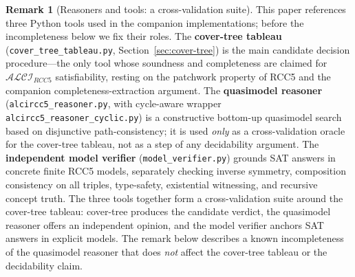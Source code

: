 \documentclass[
]{ceurart}
\theoremstyle{definition}
\newtheorem{remark}[theorem]{Remark}
\newcommand{\ALCIRCC}[1]{\ensuremath{\mathcal{ALCI}_{\mathit{RCC#1}}}}
\begin{document}
\begin{remark}[Reasoners and tools: a cross-validation suite]
\label{rem:tools}
This paper references three Python tools used in the companion
implementations; before the incompleteness below we fix their
roles. The \textbf{cover-tree tableau}
(\texttt{cover\_tree\_tableau.py}, Section~\ref{sec:cover-tree})
is the main candidate decision procedure---the only tool whose
soundness and completeness are claimed for $\ALCIRCC{5}$
satisfiability, resting on the patchwork property of RCC5 and
the companion completeness-extraction argument. The
\textbf{quasimodel reasoner}~\cite{QuasimodelReasoner}
(\texttt{alcircc5\_reasoner.py}, with cycle-aware wrapper
\texttt{alcircc5\_reasoner\_cyclic.py}) is a constructive
bottom-up quasimodel search based on disjunctive
path-consistency; it is used \emph{only} as a cross-validation
oracle for the cover-tree tableau, not as a step of any
decidability argument. The \textbf{independent model verifier}
(\texttt{model\_verifier.py}) grounds SAT answers in concrete
finite RCC5 models, separately checking inverse symmetry,
composition consistency on all triples, type-safety,
existential witnessing, and recursive concept truth. The three
tools together form a cross-validation suite around the
cover-tree tableau: cover-tree produces the candidate verdict,
the quasimodel reasoner offers an independent opinion, and the
model verifier anchors SAT answers in explicit models. The
remark below describes a known incompleteness of the
quasimodel reasoner that does \emph{not} affect the cover-tree
tableau or the decidability claim.
\end{remark}
\end{document}
